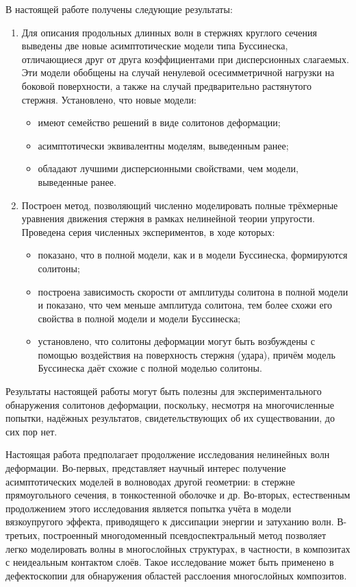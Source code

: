 \documentclass[12pt, a4paper]{report}
\begin{document}
В настоящей работе получены следующие результаты:
\begin{enumerate}
	\item Для описания продольных длинных волн в стержнях круглого сечения выведены две новые асимптотические модели типа Буссинеска, отличающиеся друг от друга коэффициентами при дисперсионных слагаемых. Эти модели обобщены на случай ненулевой осесимметричной нагрузки на боковой поверхности, а также на случай предварительно растянутого стержня. Установлено, что новые модели:
	\begin{itemize}[noitemsep,topsep=1pt]
		\item имеют семейство решений в виде солитонов деформации;
		\item асимптотически эквивалентны моделям, выведенным ранее;
		\item обладают лучшими дисперсионными свойствами, чем модели, выведенные ранее.
	\end{itemize}

	\item Построен метод, позволяющий численно моделировать полные трёхмерные уравнения движения стержня в рамках нелинейной теории упругости. Проведена серия численных экспериментов, в ходе которых:
	\begin{itemize}[noitemsep,topsep=1pt]
		\item показано, что в полной модели, как и в модели Буссинеска, формируются солитоны;
		\item построена зависимость скорости от амплитуды солитона в полной модели и показано, что чем меньше амплитуда солитона, тем более схожи его свойства в полной модели и модели Буссинеска;
		\item установлено, что солитоны деформации могут быть возбуждены с помощью воздействия на поверхность стержня (удара), причём модель Буссинеска даёт схожие с полной моделью солитоны.
	\end{itemize}
\end{enumerate}

Результаты настоящей работы могут быть полезны для экспериментального обнаружения солитонов деформации, поскольку, несмотря на многочисленные попытки, надёжных результатов, свидетельствующих об их существовании, до сих пор нет.

Настоящая работа предполагает продолжение исследования нелинейных волн деформации. Во-первых, представляет научный интерес получение асимптотических моделей в волноводах другой геометрии: в стержне прямоугольного сечения, в тонкостенной оболочке и др. Во-вторых, естественным продолжением этого исследования является попытка учёта в модели вязкоупругого эффекта, приводящего к диссипации энергии и затуханию волн. В-третьих, построенный многодоменный псевдоспектральный метод позволяет легко моделировать волны в многослойных структурах, в частности, в композитах с неидеальным контактом слоёв. Такое исследование может быть применено в дефектоскопии для обнаружения областей расслоения многослойных композитов.
\end{document}
